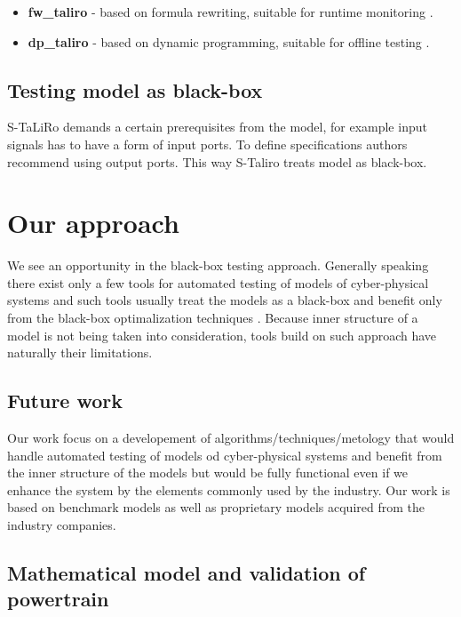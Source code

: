 \documentclass[english,technical,10pt]{FITreport}[2018/01/26]
\begin{document}
\begin{itemize}
\item \textbf{fw\_taliro} - based on formula rewriting, suitable for runtime monitoring \cite{Kress-Gazi:2009}.
\item \textbf{dp\_taliro} - based on dynamic programming, suitable for offline testing \cite{Sankaranarayanan:2012}.
\end{itemize}

\subsection{Testing model as black-box}

S-TaLiRo demands a certain prerequisites from the model, for example input signals has to have a form of input ports. To define specifications authors recommend using output ports. This way S-Taliro treats model as black-box.

\section{Our approach}

We see an opportunity in the black-box testing approach. Generally speaking there exist only a few tools for automated testing of models of cyber-physical systems and such tools usually treat the models as a black-box and benefit only from the black-box optimalization techniques \cite{gendreau:2010}. Because inner structure of a model is not being taken into consideration, tools build on such approach have naturally their limitations.

\subsection{Future work}

Our work focus on a developement of algorithms/techniques/metology that would handle automated testing of models od cyber-physical systems and benefit from the inner structure of the models but would be fully functional even if we enhance the system by the elements commonly used by the industry. Our work is based on benchmark models as well as proprietary models acquired from the industry companies.

\subsection{Mathematical model and validation of powertrain}
\end{document}
